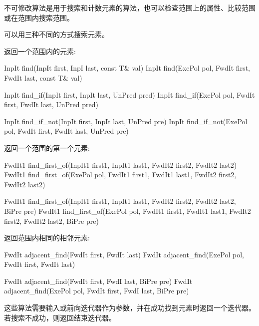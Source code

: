 不可修改算法是用于搜索和计数元素的算法，也可以检查范围上的属性、比较范围或在范围内搜索范围。


可以用三种不同的方式搜索元素。

返回一个范围内的元素:

\begin{cpp}
InpIt find(InpIt first, InpI last, const T& val)
InpIt find(ExePol pol, FwdIt first, FwdIt last, const T& val)

InpIt find_if(InpIt first, InpIt last, UnPred pred)
InpIt find_if(ExePol pol, FwdIt first, FwdIt last, UnPred pred)

InpIt find_if_not(InpIt first, InpIt last, UnPred pre)
InpIt find_if_not(ExePol pol, FwdIt first, FwdIt last, UnPred pre)
\end{cpp}

返回一个范围的第一个元素:

\begin{cpp}
FwdIt1 find_first_of(InpIt1 first1, InpIt1 last1,
					 FwdIt2 first2, FwdIt2 last2)
FwdIt1 find_first_of(ExePol pol, FwdIt1 first1, FwdIt1 last1,
					 FwdIt2 first2, FwdIt2 last2)
					 
FwdIt1 find_first_of(InpIt1 first1, InpIt1 last1,
					 FwdIt2 first2, FwdIt2 last2, BiPre pre)
FwdIt1 find_first_of(ExePol pol, FwdIt1 first1, FwdIt1 last1,
					 FwdIt2 first2, FwdIt2 last2, BiPre pre)
\end{cpp}

返回范围内相同的相邻元素:

\begin{cpp}
FwdIt adjacent_find(FwdIt first, FwdIt last)
FwdIt adjacent_find(ExePol pol, FwdIt first, FwdIt last)

FwdIt adjacent_find(FwdIt first, FwdI last, BiPre pre)
FwdIt adjacent_find(ExePol pol, FwdIt first, FwdI last, BiPre pre)
\end{cpp}

这些算法需要输入或前向迭代器作为参数，并在成功找到元素时返回一个迭代器。若搜索不成功，则返回结束迭代器。


